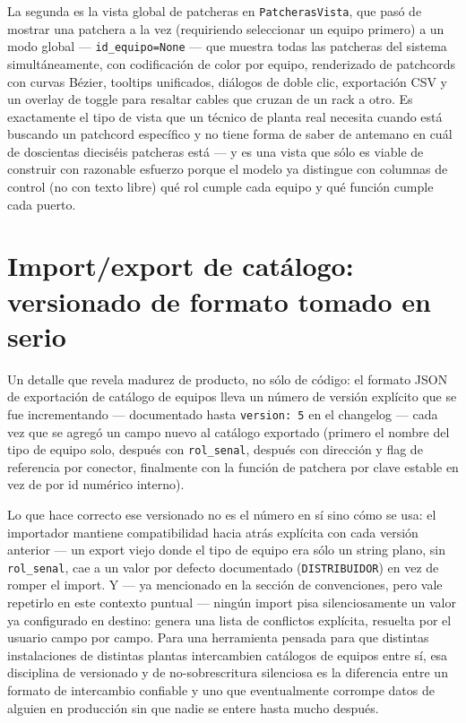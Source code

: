 \documentclass[11pt,twocolumn]{article}
\begin{document}
La segunda es la vista global de patcheras en \texttt{PatcherasVista}, que pasó de mostrar una patchera a la vez (requiriendo seleccionar un equipo primero) a un modo global --- \texttt{id\_equipo=None} --- que muestra todas las patcheras del sistema simultáneamente, con codificación de color por equipo, renderizado de patchcords con curvas Bézier, tooltips unificados, diálogos de doble clic, exportación CSV y un overlay de toggle para resaltar cables que cruzan de un rack a otro. Es exactamente el tipo de vista que un técnico de planta real necesita cuando está buscando un patchcord específico y no tiene forma de saber de antemano en cuál de doscientas dieciséis patcheras está --- y es una vista que sólo es viable de construir con razonable esfuerzo porque el modelo ya distingue con columnas de control (no con texto libre) qué rol cumple cada equipo y qué función cumple cada puerto.

\section{Import/export de catálogo: versionado de formato tomado en serio}

Un detalle que revela madurez de producto, no sólo de código: el formato JSON de exportación de catálogo de equipos lleva un número de versión explícito que se fue incrementando --- documentado hasta \texttt{version: 5} en el changelog --- cada vez que se agregó un campo nuevo al catálogo exportado (primero el nombre del tipo de equipo solo, después con \texttt{rol\_senal}, después con dirección y flag de referencia por conector, finalmente con la función de patchera por clave estable en vez de por id numérico interno).

Lo que hace correcto ese versionado no es el número en sí sino cómo se usa: el importador mantiene compatibilidad hacia atrás explícita con cada versión anterior --- un export viejo donde el tipo de equipo era sólo un string plano, sin \texttt{rol\_senal}, cae a un valor por defecto documentado (\texttt{DISTRIBUIDOR}) en vez de romper el import. Y --- ya mencionado en la sección de convenciones, pero vale repetirlo en este contexto puntual --- ningún import pisa silenciosamente un valor ya configurado en destino: genera una lista de conflictos explícita, resuelta por el usuario campo por campo. Para una herramienta pensada para que distintas instalaciones de distintas plantas intercambien catálogos de equipos entre sí, esa disciplina de versionado y de no-sobrescritura silenciosa es la diferencia entre un formato de intercambio confiable y uno que eventualmente corrompe datos de alguien en producción sin que nadie se entere hasta mucho después.
\end{document}
